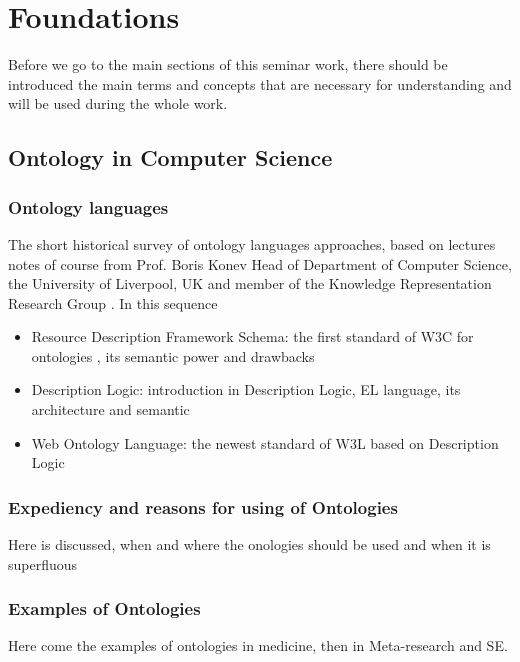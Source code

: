 \section{Foundations}
Before we go to the main sections of this seminar work, there should be introduced the main terms and concepts that are necessary for understanding and will be used during the whole work.
	\subsection{Ontology in Computer Science}
	
		\subsubsection{Ontology languages}
		The short historical survey of ontology languages approaches, based on lectures notes of course  from Prof. Boris Konev  Head of Department of Computer Science, the University of Liverpool, UK and member of the Knowledge Representation Research Group \cite{Kon10}. 
		In this sequence
			\begin{itemize}
				\item Resource Description Framework Schema: the first standard of W3C for ontologies \cite{rdfs04}, its semantic power and drawbacks
				\item Description Logic: introduction in Description Logic, EL language, its architecture and semantic
				\item Web Ontology Language: the newest standard of W3L based on Description Logic \cite{owl04}
			\end{itemize}
		\subsubsection{Expediency and reasons for using of Ontologies}
		Here is discussed, when and where the onologies should be used and when it is superfluous
		\subsubsection{Examples of Ontologies}
		Here come the examples of ontologies in medicine, then in Meta-research and SE.
		
